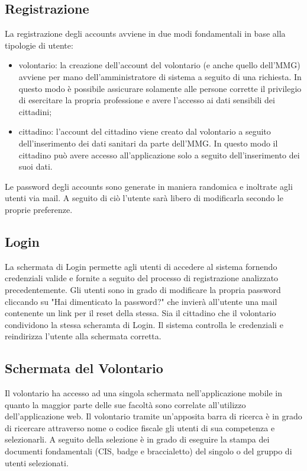 \documentclass[12pt,a4paper,twoside,openright,titlepage]{book}
\begin{document}
\subsection{Registrazione}
La registrazione degli accounts avviene in due modi fondamentali in base alla tipologie di utente:
\begin{itemize}
\item volontario: la creazione dell'account del volontario (e anche quello dell'MMG) avviene per mano dell'amministratore di sistema a seguito di una richiesta. In questo modo è possibile assicurare solamente alle persone corrette il privilegio di esercitare la propria professione e avere l'accesso ai dati sensibili dei cittadini;
\item cittadino: l'account del cittadino viene creato dal volontario a seguito dell'inserimento dei dati sanitari da parte dell'MMG. In questo modo il cittadino può avere accesso all'applicazione solo a seguito dell'inserimento dei suoi dati.
\end{itemize}
Le password degli accounts sono generate in maniera randomica e inoltrate agli utenti via mail. A seguito di ciò l'utente sarà libero di modificarla secondo le proprie preferenze.

\subsection{Login}
La schermata di Login permette agli utenti di accedere al sistema fornendo credenziali valide e fornite a seguito del processo di registrazione analizzato precedentemente. Gli utenti sono in grado di modificare la propria password cliccando su "Hai dimenticato la password?" che invierà all'utente una mail contenente un link per il reset della stessa. Sia il cittadino che il volontario condividono la stessa scheramta di Login. Il sistema controlla le credenziali e reindirizza l'utente alla schermata corretta.

\subsection{Schermata del Volontario}
Il volontario ha accesso ad una singola schermata nell'applicazione mobile in quanto la maggior parte delle sue facoltà sono correlate all'utilizzo dell'applicazione web. Il volontario tramite un'apposita barra di ricerca è in grado di ricercare attraverso nome o codice fiscale gli utenti di sua competenza e selezionarli. A seguito della selezione è in grado di eseguire la stampa dei documenti fondamentali (CIS, badge e braccialetto) del singolo o del gruppo di utenti selezionati.
\end{document}
